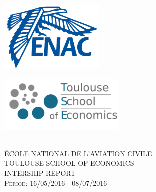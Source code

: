 \documentclass[titlepage, 11pt]{article}
\begin{document}
\begin{titlepage}


\newcommand{\HRule}{\rule{\linewidth}{0.5mm}} %

\center %
\begin{minipage}{0.4\textwidth}
\begin{flushleft} 
\includegraphics[width=50mm,scale=0.3]{ENAC.png}\\[1cm] %
\end{flushleft}
\end{minipage}
\begin{minipage}{0.4\textwidth}
\begin{flushright}
 \includegraphics[width=60mm,scale=0.6]{TSE.png}\\[1cm]
 \end{flushright}
\end{minipage}\\[1.5cm]


\textsc{\LARGE ÉCOLE NATIONAL DE L'AVIATION CIVILE }\\[1cm] %
\textsc{\LARGE TOULOUSE SCHOOL OF ECONOMICS }\\[1.5cm]
\textsc{\Large INTERSHIP REPORT}\\[1 cm] %
\textsc{\large Period: 16/05/2016 - 08/07/2016}\\[1.5cm] %


\end{titlepage}
\end{document}
